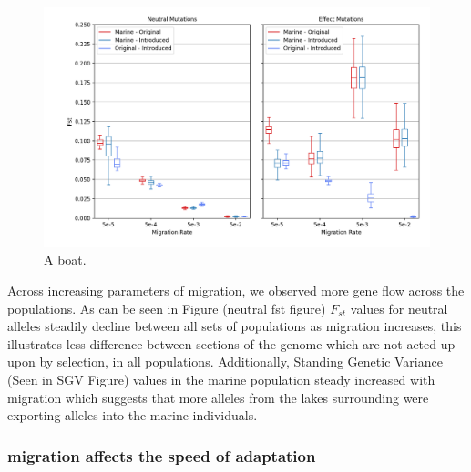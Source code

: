 \documentclass{article}
\begin{document}
\begin{figure}[htb]
	\begin{center}
  		\includegraphics[width=01.0\linewidth]{matplotlib/Fst.png}
  		\caption{A boat.}
  		\label{fig:boat1}
	\end{center}
\end{figure}

Across increasing parameters of migration, we observed more gene flow across the populations. 
As can be seen in Figure (neutral fst figure)
$F_{st}$ values for neutral alleles steadily decline between all sets of populations as 
migration increases, this illustrates less difference between sections of the genome which are not acted up 
upon by selection, in all populations.
Additionally, Standing Genetic Variance 
(Seen in SGV Figure)
values in the marine population steady increased with migration which suggests that more alleles from the 
lakes surrounding were exporting alleles into the marine individuals.


\subsubsection*{migration affects the speed of adaptation}

\end{document}

